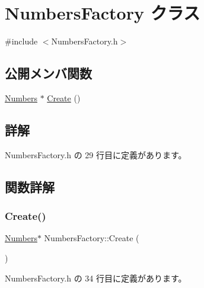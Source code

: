 \hypertarget{class_numbers_factory}{}\section{Numbers\+Factory クラス}
\label{class_numbers_factory}


{\ttfamily \#include $<$Numbers\+Factory.\+h$>$}

\subsection*{公開メンバ関数}
\begin{DoxyCompactItemize}
\item 
\mbox{\hyperlink{class_numbers}{Numbers}} $\ast$ \mbox{\hyperlink{class_numbers_factory_a2d2d0ae4f2d27c25cc73989b64d78c77}{Create}} ()
\end{DoxyCompactItemize}


\subsection{詳解}


 Numbers\+Factory.\+h の 29 行目に定義があります。



\subsection{関数詳解}
\mbox{\label{class_numbers_factory_a2d2d0ae4f2d27c25cc73989b64d78c77}} 
\subsubsection{\texorpdfstring{Create()}{Create()}}
{\footnotesize\ttfamily \mbox{\hyperlink{class_numbers}{Numbers}}$\ast$ Numbers\+Factory\+::\+Create (\begin{DoxyParamCaption}{ }\end{DoxyParamCaption})\hspace{0.3cm}{\ttfamily [inline]}}



 Numbers\+Factory.\+h の 34 行目に定義があります。

